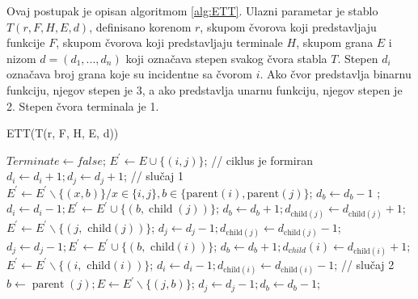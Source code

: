 \documentclass[main.tex]{subfiles}
\begin{document}
Ovaj postupak je opisan algoritmom \autoref{alg:ETT}. Ulazni parametar je stablo $T(r, F, H, E, d)$, definisano korenom $r$, skupom čvorova koji predstavljaju funkcije $F$, skupom čvorova koji predstavljaju terminale $H$, skupom grana $E$ i nizom $d = (d_1, ..., d_n)$ koji označava stepen svakog čvora stabla $T$. Stepen $d_i$ označava broj grana koje su incidentne sa čvorom $i$. Ako čvor predstavlja binarnu funkciju, njegov stepen je 3, a ako predstavlja unarnu funkciju, njegov stepen je 2. Stepen čvora terminala je 1.

\begin{algorithm}
\caption{ETT(T(r, F, H, E, d))}
\label{alg:ETT}
  \begin{algorithmic}[1]
    \STATE $Terminate \leftarrow false$; 
            \STATE $E^{\prime} \leftarrow E \cup\{(i, j)\}$; \color{gray} // ciklus je formiran \color{black}
            \STATE $d_{i} \leftarrow d_{i}+1 ; d_{j} \leftarrow d_{j}+1$;
                \STATE \color{gray}// slučaj 1 \color{black}
                \STATE $E^{\prime} \leftarrow E^{\prime} \backslash\{(x, b)\} / x \in\{i, j\}, b \in\{\text {parent}(i), \text{parent}(j)\}$;
                \STATE $d_{b} \leftarrow d_{b}-1$ ;
                    \STATE $d_{i} \leftarrow d_{i}-1 ; E^{\prime} \leftarrow E^{\prime} \cup\{(b, \operatorname{child}(j))\}$;
                    \STATE $d_{b} \leftarrow d_{b}+1 ; d_{\text {child}(j)} \leftarrow d_{\text {child}(j)}+1$;
                    \STATE $E^{\prime} \leftarrow E^{\prime} \backslash\{(j, \text { child}(j))\}$;
                    \STATE $d_{j} \leftarrow d_{j}-1 ; d_{\text {child}(j)} \leftarrow d_{\text {child}(j)}-1$;
                \ELSE
                    \STATE $d_{j} \leftarrow d_{j}-1 ; E^{\prime} \leftarrow E^{\prime} \cup\{(b, \text { child}(i))\}$;
                    \STATE $d_{b} \leftarrow d_{b}+1 ; d_{child}(i) \leftarrow d_{\text {child}(i)}+1$;
                    \STATE $E^{\prime} \leftarrow E^{\prime} \backslash\{(i, \text { child}(i))\}$;
                    \STATE $d_{i} \leftarrow d_{i}-1 ; d_{\text {child}(i)} \leftarrow d_{\text {child}(i)}-1$;
                \ENDIF
            \ELSE 
                \STATE \color{gray}// slučaj 2 \color{black}
                \STATE $b \leftarrow \operatorname{parent}(j) ; E \leftarrow E^{\prime} \backslash\{(j, b)\}$;
                \STATE $d_{j} \leftarrow d_{j}-1 ; d_{b} \leftarrow d_{b}-1$;

\end{algorithmic}
\end{algorithm}
\end{document}
